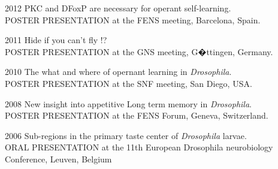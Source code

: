 
%

\begin{itemize}

\begin{sloppypar}
\item[2012] PKC and DFoxP are necessary for operant self-learning. 
\\POSTER PRESENTATION at the FENS meeting, Barcelona, Spain.


\item[2011] Hide if you can't fly !?
\\POSTER PRESENTATION at the GNS meeting, G�ttingen, Germany.

\item[2010] The what and where of opernant learning in \textit{Drosophila}.
\\POSTER PRESENTATION at the SNF meeting, San Diego, USA.
%
\item[2008] New insight into appetitive Long term memory in \textit{Drosophila}.
\\POSTER PRESENTATION at the FENS Forum, Geneva, Switzerland.


\item[2006] Sub-regions in the primary taste center of \textit{Drosophila} larvae.
\\ORAL PRESENTATION at the 11th European Drosophila neurobiology Conference, Leuven, Belgium



%


\end{sloppypar}
\end{itemize}
